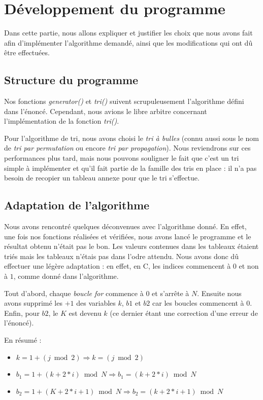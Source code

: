 \documentclass[12pt]{article}
\begin{document}
\section{Développement du programme}

Dans cette partie, nous allons expliquer et justifier les choix que nous avons
fait afin d'implémenter l'algorithme demandé, ainsi que les modifications qui
ont dû être effectuées.

\subsection{Structure du programme}

Nos fonctions \emph{generator()} et \emph{tri()} suivent scrupuleusement
l'algorithme défini dans l'énoncé. Cependant, nous avions le libre arbitre
concernant l'implémentation de la fonction \emph{tri()}.
    
Pour l'algorithme de tri, nous avons choisi le \emph{tri à bulles} (connu aussi
sous le nom de \emph{tri par permutation} ou encore \emph{tri par propagation}).
Nous reviendrons sur ces performances plus tard, mais nous pouvons souligner le
fait que c'est un tri simple à implémenter et qu'il fait partie de la famille
des tris en place : il n'a pas besoin de recopier un tableau annexe pour que le
tri s'effectue. 

\subsection{Adaptation de l'algorithme}

Nous avons rencontré quelques déconvenues avec l'algorithme donné. En effet, une
fois nos fonctions réalisées et vérifiées, nous avons lancé le programme et le
résultat obtenu n'était pas le bon. Les valeurs contenues dans les tableaux
étaient triés mais les tableaux n'étais pas dans l'odre attendu. Nous avons donc
dû effectuer une légère adaptation : en effet, en C, les indices commencent à $0$
et non à $1$, comme donné dans l'algorithme.

Tout d'abord, chaque \emph{boucle for} commence à $0$ et s'arrête à $N$. Ensuite
nous avons supprimé les $+1$ des variables $k$, $b1$ et $b2$ car les boucles
commencent à 0. Enfin, pour $b2$, le $K$ est devenu $k$ (ce dernier étant une
correction d'une erreur de l'énoncé). 

En résumé :
\begin{itemize}
    \item $k = 1+(j\bmod 2) \Rightarrow k = (j\bmod 2)$
    \item $b_1 = 1+(k+2*i)\bmod N \Rightarrow b_1 = (k+2*i)\bmod N$
    \item $b_2 = 1+(K+2*i+1)\bmod N \Rightarrow b_2 = (k+2*i+1)\bmod N$
\end{itemize}
\end{document}
